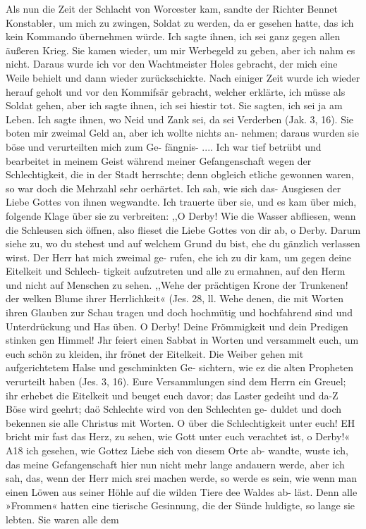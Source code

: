 Als nun die Zeit der Schlacht von Worcester kam, sandte
der Richter Bennet Konstabler, um mich zu zwingen, Soldat zu
werden, da er gesehen hatte, das ich kein Kommando übernehmen
würde. Ich sagte ihnen, ich sei ganz gegen allen 
äußeren Krieg.
Sie kamen wieder, um mir Werbegeld zu geben, aber ich nahm
es nicht. Daraus wurde ich vor den 
Wachtmeister Holes gebracht,
der mich eine Weile behielt und dann wieder zurückschickte. Nach
einiger Zeit wurde ich wieder herauf geholt und vor den Kommifsär
gebracht, welcher erklärte, ich müsse als Soldat gehen, aber ich
sagte ihnen, ich sei hiestir tot. Sie sagten, ich sei ja am Leben.
Ich sagte ihnen, wo Neid und Zank sei, da sei Verderben (Jak. 3, 16).
Sie boten mir zweimal Geld an, aber ich wollte nichts an-
nehmen; daraus wurden sie böse und verurteilten mich zum Ge-
fängnis- ....
Ich war tief betrübt und bearbeitet in meinem Geist während
meiner Gefangenschaft wegen der Schlechtigkeit, die in der Stadt
herrschte; denn obgleich etliche gewonnen waren, so war doch die
Mehrzahl sehr oerhärtet. Ich sah, wie sich das- Ausgiesen der
Liebe Gottes von ihnen wegwandte. Ich trauerte über sie, und
es kam über mich, folgende Klage über sie zu verbreiten:
,,O Derby! Wie die Wasser abfliesen, wenn die Schleusen
sich öffnen, also flieset die Liebe Gottes von dir ab, o Derby.
Darum siehe zu, wo du stehest und auf welchem Grund du bist,
ehe du gänzlich verlassen wirst. Der Herr hat mich zweimal ge-
rufen, ehe ich zu dir kam, um gegen deine Eitelkeit und Schlech-
tigkeit aufzutreten und alle zu ermahnen, auf den Herm und
nicht auf Menschen zu sehen. ,,Wehe der prächtigen Krone der
Trunkenen! der welken Blume ihrer Herrlichkeit« (Jes. 28, ll.
Wehe denen, die mit Worten ihren Glauben zur Schau tragen und
doch hochmütig und hochfahrend sind und Unterdrückung und Has
üben. O Derby! Deine Frömmigkeit und dein Predigen stinken
gen Himmel! Jhr feiert einen Sabbat in Worten und versammelt
euch, um euch schön zu kleiden, ihr frönet der Eitelkeit. Die
Weiber gehen mit aufgerichtetem Halse und geschminkten Ge-
sichtern, wie ez die alten Propheten verurteilt haben (Jes. 3, 16).
Eure Versammlungen sind dem Herrn ein Greuel; ihr erhebet
die Eitelkeit und beuget euch davor; das Laster gedeiht und da-Z
Böse wird geehrt; daö Schlechte wird von den Schlechten ge-
duldet und doch bekennen sie alle Christus mit Worten. O über
die Schlechtigkeit unter euch! EH bricht mir fast das Herz, zu
sehen, wie Gott unter euch verachtet ist, o Derby!«
A18 ich gesehen, wie Gottez Liebe sich von diesem Orte ab-
wandte, wuste ich, das meine Gefangenschaft hier nun nicht mehr
lange andauern werde, aber ich sah, das, wenn der Herr mich
srei machen werde, so werde es sein, wie wenn man einen
Löwen aus seiner Höhle auf die wilden Tiere dee Waldes ab-
läst. Denn alle »Frommen« hatten eine tierische Gesinnung, die
der Sünde huldigte, so lange sie lebten. Sie waren alle dem


